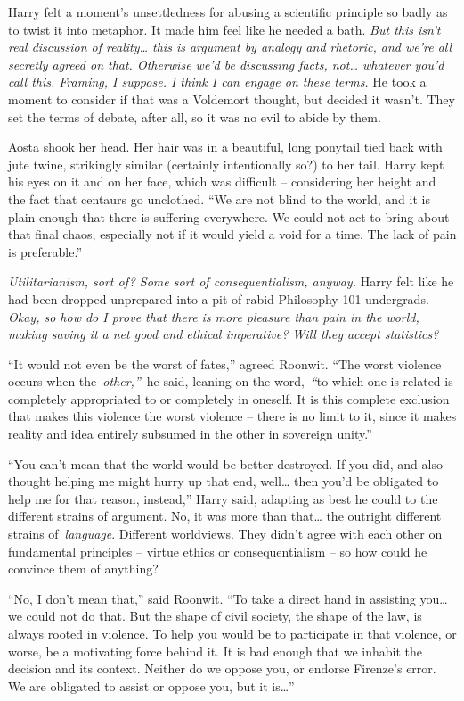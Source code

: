 Harry felt a moment's unsettledness for abusing a scientific principle
so badly as to twist it into metaphor. It made him feel like he needed a
bath. \emph{But this isn't real discussion of reality\ldots{} this is
argument by analogy and rhetoric, and we're all secretly agreed on that.
Otherwise we'd be discussing facts, not\ldots{} whatever you'd call
this. Framing, I suppose. I think I can engage on these terms.} He took
a moment to consider if that was a Voldemort thought, but decided it
wasn't. They set the terms of debate, after all, so it was no evil to
abide by them.

Aosta shook her head. Her hair was in a beautiful, long ponytail tied
back with jute twine, strikingly similar (certainly intentionally so?)
to her tail. Harry kept his eyes on it and on her face, which was
difficult -- considering her height and the fact that centaurs go
unclothed. ``We are not blind to the world, and it is plain enough that
there is suffering everywhere. We could not act to bring about that
final chaos, especially not if it would yield a void for a time. The
lack of pain is preferable.''

\emph{Utilitarianism, sort of? Some sort of consequentialism, anyway.}
Harry felt like he had been dropped unprepared into a pit of rabid
Philosophy 101 undergrads. \emph{Okay, so how do I prove that there is
more pleasure than pain in the world, making saving it a net good and
ethical imperative? Will they accept statistics?}

``It would not even be the worst of fates,'' agreed Roonwit. ``The worst
violence occurs when the~\emph{other,''}~he said, leaning on the
word,~\emph{``}to which one is related is completely appropriated to or
completely in oneself. It is this complete exclusion that makes this
violence the worst violence -- there is no limit to it, since it makes
reality and idea entirely subsumed in the other in sovereign unity.''

``You can't mean that the world would be better destroyed. If you did,
and also thought helping me might hurry up that end, well\ldots{} then
you'd be obligated to help me for that reason, instead,'' Harry said,
adapting as best he could to the different strains of argument. No, it
was more than that\ldots{} the outright different strains
of~\emph{language}. Different worldviews. They didn't agree with each
other on fundamental principles -- virtue ethics or consequentialism --
so how could he convince them of anything?

``No, I don't mean that,'' said Roonwit. ``To take a direct hand in
assisting you\ldots{} we could not do that. But the shape of civil
society, the shape of the law, is always rooted in violence. To help you
would be to participate in that violence, or worse, be a motivating
force behind it. It is bad enough that we inhabit the decision and its
context. Neither do we oppose you, or endorse Firenze's error. We are
obligated to assist or oppose you, but it is\ldots{}''

